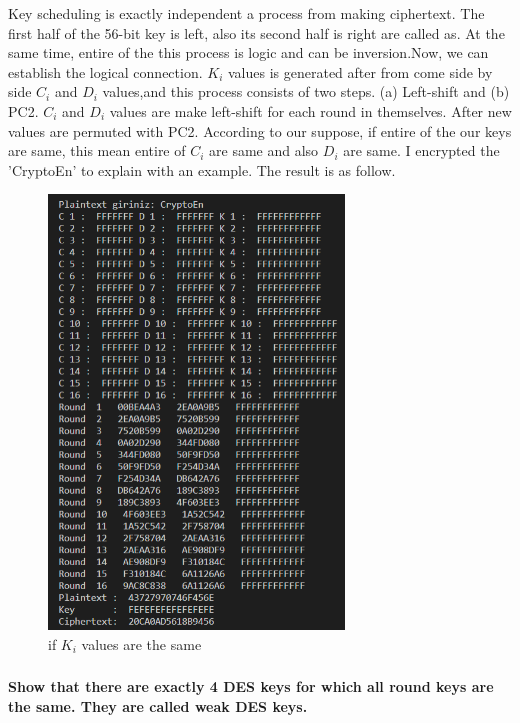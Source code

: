 \documentclass[11pt]{article}
\begin{document}
Key scheduling is exactly independent a process from making ciphertext. The first half of the 56-bit key is left, also its second half 
is right are called as. At the same time, entire of the this process is logic and can be inversion.Now, we can establish the logical connection. 
$K_{i}$ values is generated after from come side by side $C_{i}$  and $D_{i}$ values,and this process consists of two steps.
(a) Left-shift and (b) PC2. $C_{i}$  and $D_{i}$ values are make left-shift for each round in themselves. After new values are permuted with PC2. According to our suppose,
if entire of the our keys are same, this mean entire of  $C_{i}$ are same and also $D_{i}$ are same. I encrypted the 'CryptoEn' to explain with an example.
The result is as follow.\\
\begin{figure}[!h]
  \centering
  \includegraphics[width=0.7\textwidth]{Screenshot_3.png}
  \caption{if $K_{i}$ values are the same }
  \label{fig:boat1}
\end{figure}

\newpage
\subsubsection{}\textbf{Show that there are exactly 4 DES keys for which all round keys are the same. They are
called weak DES keys.}\\
\end{document}
